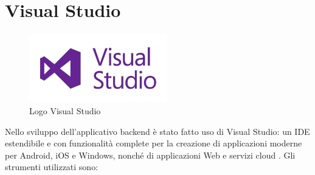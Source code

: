 \pagebreak
\section{Visual Studio}
\begin{figure}[ht!]
\begin{center}
  \includegraphics[width=6cm]{images/logoVS.jpeg}
  \caption{Logo Visual Studio}
\end{center}
\end{figure}
Nello sviluppo dell'applicativo backend è stato fatto uso di Visual Studio: un IDE estendibile e con funzionalità complete per la creazione di applicazioni moderne per Android, iOS e Windows, nonché di applicazioni Web e servizi cloud \cite{VS}. Gli strumenti utilizzati sono:
